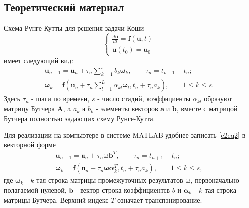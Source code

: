 \chapter{}

\section{Теоретический материал}
Схема Рунге-Кутты для решения задачи Коши
\begin{equation} \label{c2eq1}
	\begin{cases}
		\displaystyle \frac{d\mathbf{u}}{dt} = \mathbf{f} \left( \mathbf{u}, t \right) \\
		\mathbf{u}(t_0) = \mathbf{u}_0
	\end{cases}
\end{equation}
имеет следующий вид:
\begin{equation} \label{c2eq2}
	\begin{split}
		\mathbf{u}_{n+1} = \mathbf{u}_n + \tau_n \sum_{k=1}^{s} b_k \boldsymbol{\omega}_k, 
	\qquad
		\tau_n = t_{n+1} - t_n; \\
		\boldsymbol{\omega}_k = \mathbf{f} \left( \mathbf{u}_n + \tau_n \sum_{l=1}^{L} \alpha_{kl} \boldsymbol{\omega}_l, t_n + \tau_n a_k \right),
	\qquad
		1 \le k \le s.
	\end{split}
\end{equation}
Здесь $\tau_n$ - шаги по времени, $s$ - число стадий, коэффициенты $\alpha_{kl}$ образуют матрицу Бутчера $\mathbf{A}$, a $a_k$ и $b_k$ - элементы векторов $\mathbf{a}$ и $\mathbf{b}$, вместе с матрицой Бутчера полностью задающих схему Рунге-Кутта.

Для реализации на компьютере в системе MATLAB удобнее записать \eqref{c2eq2} в векторной форме
\begin{equation} \label{c2eq3}
	\begin{split}
		\mathbf{u}_{n+1} = \mathbf{u}_n + \tau_n \boldsymbol{\omega} \mathbf{b}^T,
	\qquad
		\tau_n = t_{n+1} - t_n; \\
		\boldsymbol{\omega}_k = \mathbf{f} \left( \mathbf{u}_n + \tau_n \boldsymbol{\omega} \boldsymbol{\alpha}^T_k, t_n + \tau_n a_k \right),
	\qquad
		1 \le k \le s,
	\end{split} 
\end{equation}
где $\boldsymbol{\omega}_k$ - $k$-тая строка матрицы промежуточных результатов $\boldsymbol{\omega}$, первоначально полагаемой нулевой, $\mathbf{b}$ - вектор-строка коэффициентов $b$ и $\boldsymbol{\alpha}_k$ - $k$-тая строка матрицы Бутчера. Верхний индекс $T$ означает транспонирование.

